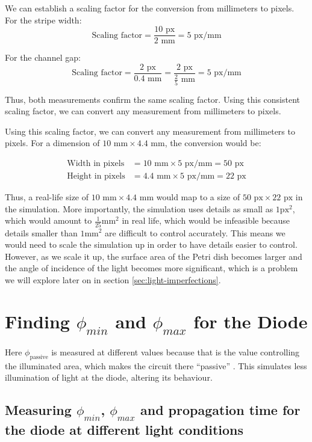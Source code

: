 We can establish a scaling factor for the conversion from millimeters to pixels.
For the stripe width:
\[ \text{Scaling factor} = \frac{10 \text{ px}}{2 \text{ mm}} = 5 \text{ px/mm} \]

For the channel gap:
\[ \text{Scaling factor} = \frac{2 \text{ px}}{0.4 \text{ mm}} = \frac{2 \text{ px}}{\frac{2}{5} \text{ mm}} = 5 \text{ px/mm} \]

Thus, both measurements confirm the same scaling factor. Using this consistent scaling factor, we can convert any measurement from millimeters to pixels.

Using this scaling factor, we can convert any measurement from millimeters to pixels.
For a dimension of \(10 \text{ mm} \times 4.4 \text{ mm}\), the conversion would be:

\begin{align*}
\text{Width in pixels} &= 10 \text{ mm} \times 5 \text{ px/mm} = 50 \text{ px} \\
\text{Height in pixels} &= 4.4 \text{ mm} \times 5 \text{ px/mm} = 22 \text{ px}
\end{align*}

Thus, a real-life size of \(10 \text{ mm} \times 4.4 \text{ mm}\) would map to a size of \(50 \text{ px} \times 22 \text{ px}\) in the simulation.
More importantly, the simulation uses details as small as $1\text{px}^2$, which would amount to $\frac{1}{25}\text{mm}^2$ in real life, which would be infeasible because details smaller than $1\text{mm}^2$ are difficult to control accurately.
This means we would need to scale the simulation up in order to have details easier to control. 
However, as we scale it up, the surface area of the Petri dish becomes larger and the angle of incidence of the light becomes more significant, which is a problem we will explore later on in section \ref{sec:light-imperfections}.


\section{Finding $\phi_{min}$ and $\phi_{max}$ for the Diode} \label{sec:finding-phi-min-max}
Here $\phi_{\text{passive}}$ is measured at different values because that is the value controlling the illuminated area, which makes the circuit there ``passive'' . This simulates less illumination of light at the diode, altering its behaviour.
\subsection{Measuring $\phi_{min}$, $\phi_{max}$ and propagation time for the diode at different light conditions}


